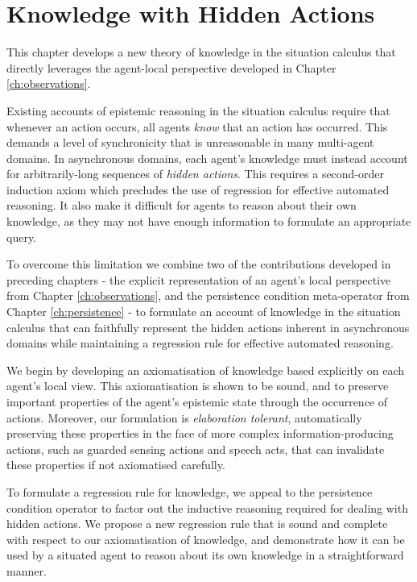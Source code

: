 

\chapter{Knowledge with Hidden Actions}

\label{ch:knowledge}

This chapter develops a new theory of knowledge in the situation calculus
that directly leverages the agent-local perspective developed in Chapter
\ref{ch:observations}.

Existing accounts of epistemic reasoning in the situation calculus
require that whenever an action occurs, all agents \emph{know} that
an action has occurred. This demands a level of synchronicity that
is unreasonable in many multi-agent domains. In asynchronous domains,
each agent's knowledge must instead account for arbitrarily-long sequences
of \emph{hidden actions}. This requires a second-order induction axiom
which precludes the use of regression for effective automated reasoning.
It also make it difficult for agents to reason about their own knowledge,
as they may not have enough information to formulate an appropriate
query.

To overcome this limitation we combine two of the contributions developed
in preceding chapters - the explicit representation of an agent's
local perspective from Chapter \ref{ch:observations}, and the persistence
condition meta-operator from Chapter \ref{ch:persistence} - to formulate
an account of knowledge in the situation calculus that can faithfully
represent the hidden actions inherent in asynchronous domains while
maintaining a regression rule for effective automated reasoning.

We begin by developing an axiomatisation of knowledge based explicitly
on each agent's local view. This axiomatisation is shown to be sound,
and to preserve important properties of the agent's epistemic
state through the occurrence of actions. Moreover, our formulation
is \emph{elaboration tolerant}, automatically preserving these properties
in the face of more complex information-producing actions, such as
guarded sensing actions and speech acts, that can invalidate these
properties if not axiomatised carefully.

To formulate a regression rule for knowledge, we appeal to the persistence
condition operator to factor out the inductive reasoning required
for dealing with hidden actions. We propose a new regression rule
that is sound and complete with respect to our axiomatisation of knowledge,
and demonstrate how it can be used by a situated agent to reason about
its own knowledge in a straightforward manner.


